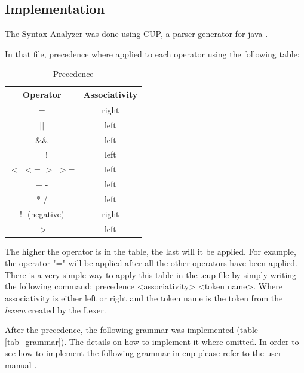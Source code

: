 \documentclass[conference]{IEEEtran}
\begin{document}
\subsection{Implementation}

The Syntax Analyzer was done using CUP, a parser generator for java \cite{CUP}.

In that file, precedence where applied to each operator using the following table:
\begin{table}[H]
	\begin{center}
	\begin{tabular}{||c c||}
		\hline
		Operator & Associativity  \\ [0.5ex] 
		\hline\hline
		= & right \\ 
		\hline
		$|$$|$ & left  \\
		\hline
		\&\& & left  \\
		\hline
		== != & left  \\
		\hline
		$<$ $<$= $>$ $>$= & left \\ [1ex] 
		\hline
		+ - & left \\
		\hline
		* / & left \\
		\hline
		! -(negative) & right \\
		\hline
		-$>$ & left \\
		\hline
	\end{tabular}
	\end{center}
	\caption{Precedence} \label{tab_precedence}
\end{table}

The higher the operator is in the table, the last will it be applied. For example, the operator "=" will be applied after all the other operators have been applied. There is a very simple way to apply this table in the .cup file by simply writing the following command: precedence <associativity> <token name>. Where associativity is either left or right and the token name is the token from the \textit{lexem} created by the Lexer.

After the precedence, the following grammar was implemented (table \ref{tab_grammar}). The details on how to implement it where omitted. In order to see how to implement the following grammar in cup please refer to the user manual \cite{CUP_MANUAL}.
\end{document}
